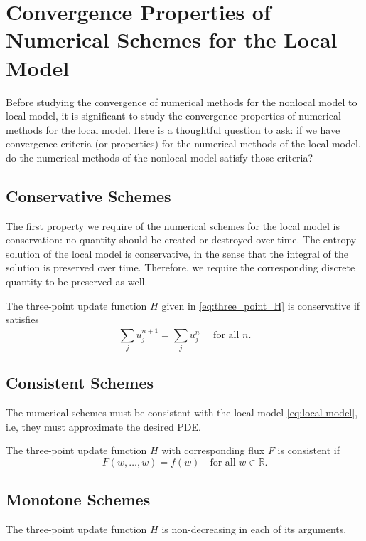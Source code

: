 \section{Convergence Properties of Numerical Schemes for the Local Model}
Before studying the convergence of numerical methods for the nonlocal model to local model, it is significant to study the convergence properties of numerical methods for the local model. Here is a thoughtful question to ask: if we have convergence criteria (or properties) for the numerical methods of the local model, do the numerical methods of the nonlocal model satisfy those criteria?
\subsection{Conservative Schemes}
The first property we require of the numerical schemes for the local model is conservation: no quantity should be created or destroyed over time. The entropy solution of the local model is conservative, in the sense that the integral of the solution is preserved over time. Therefore, we require the corresponding discrete quantity to be preserved as well.
\begin{definition}
    The three-point update function $H$ given in \eqref{eq:three_point_H} is conservative if satisfies
    \[ \sum_{j}^{} u_{j}^{n+1} = \sum_{j}^{} u_{j}^{n} \quad \text{ for all } n .\]
\end{definition}
\subsection{Consistent Schemes}
The numerical schemes must be consistent with the local model \eqref{eq:local model}, i.e, they must approximate the desired PDE.
\begin{definition}[Consistency]
    The three-point update function $H$ with corresponding flux $F$ is consistent if
    \[ F(w,\dots, w) = f(w) \quad \text{for all } w \in \mathbb{R}.\]
\end{definition}
\subsection{Monotone Schemes}
\begin{definition}[Monotonicity]
    The three-point update function $H$ is non-decreasing in each of its arguments.
\end{definition}


